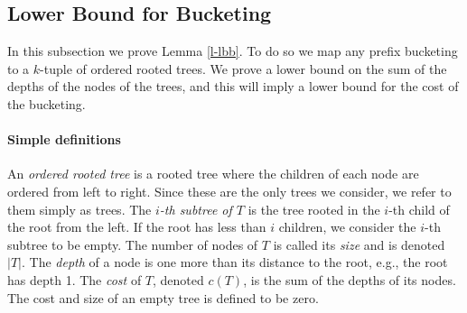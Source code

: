 \documentclass[11pt]{article}
\begin{document}
\subsection{Lower Bound for Bucketing}\label{s-lbb}

In this subsection we prove Lemma \ref{l-lbb}.
To do so we map any prefix bucketing to a $k$-tuple of ordered rooted trees.
We prove a lower bound on the sum of the depths of the nodes of the trees,
and this will imply a lower bound for the cost of the bucketing.

\paragraph{Simple definitions}
An {\em ordered rooted tree} is a rooted tree where the children of each node are ordered from left to right.
Since these are the only trees we consider, we refer to them simply as trees.
The \emph{$i$-th subtree of $T$} is the tree rooted in the $i$-th child of the root from the left.
If the root has less than $i$ children, we consider the $i$-th subtree to be empty.
The number of nodes of $T$ is called its {\em size} and is denoted $|T|$.
The {\em depth} of a node is  one more than its distance to the root, e.g., the root has depth 1.
The \emph{cost} of $T$, denoted $c(T)$, is the sum of the depths of its nodes.
The cost and size of an empty tree is defined to be zero.
\end{document}
